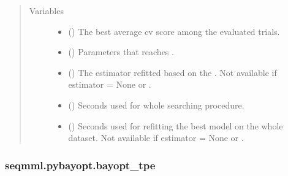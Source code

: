 \documentclass[letterpaper,10pt,english]{sphinxmanual}
\begin{document}
\begin{fulllineitems}
\begin{sphinxVerbatim}[commandchars=\\\{\}]
 
\end{sphinxVerbatim}
\begin{quote}\begin{description}
\item[{Variables}] \leavevmode\begin{itemize}
\item {} 
 () \textendash{} The best average cv score among the evaluated trials.

\item {} 
 () \textendash{} Parameters that reaches .

\item {} 
 () \textendash{} The estimator refitted based on the . 
Not available if estimator = None or .

\item {} 
 () \textendash{} Seconds used for whole searching procedure.

\item {} 
 () \textendash{} Seconds used for refitting the best model on the whole dataset.
Not available if estimator = None or .

\end{itemize}

\end{description}\end{quote}

\end{fulllineitems}



\subsubsection{seqmml.pybayopt.bayopt\_tpe}
\label{\detokenize{apidoc:module-pybayopt.bayopt_tpe}}\label{\detokenize{apidoc:seqmml-pybayopt-bayopt-tpe}}
\end{document}
